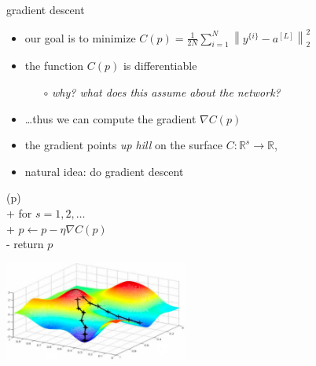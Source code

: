 \documentclass[xcolor={svgnames},
               hyperref={colorlinks,citecolor=DeepPink4,linkcolor=FireBrick,urlcolor=Maroon}]
               {beamer}
\newcommand{\grad}{\nabla}
\newcommand{\RR}{\mathbb{R}}
\begin{document}
\begin{frame}{gradient descent}

\begin{itemize}
\item our goal is to minimize \quad \small $\displaystyle C(p) = \frac{1}{2N} \sum_{i=1}^N \left\|y^{\{i\}} - a^{[L]}\right\|_2^2$ \normalsize
\item the function $C(p)$ is differentiable
    \begin{itemize}
    \item[$\circ$] \emph{why? what does this assume about the network?}
    \end{itemize}
\item \dots thus we can compute the \alert{gradient} $\grad C(p)$
\item the gradient points \emph{up hill} on the surface $C:\RR^s\to\RR$,
\item natural idea: do \alert{gradient descent}
\end{itemize}
\begin{pseudo*}
(p)\text{:} \\+
    for $s = 1,2,\dots$ \\+
        $p \gets p - \eta \grad C(p)$ \\-
    return $p$
\end{pseudo*}

\vspace{-25mm}
\hfill \includegraphics[width=0.45\textwidth]{figs/gdsurface}
\end{frame}
\end{document}
